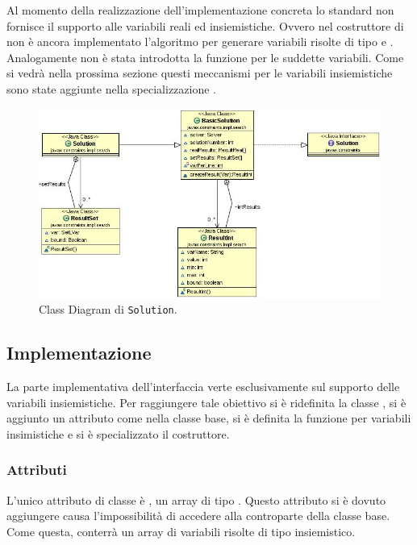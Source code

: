 Al momento della realizzazione dell'implementazione concreta 
lo standard non fornisce il supporto alle variabili reali ed 
insiemistiche. Ovvero nel costruttore di  non è ancora 
implementato l'algoritmo
per generare variabili risolte di tipo  e .
Analogamente non è stata introdotta la funzione  per
le suddette variabili. Come si vedrà nella prossima sezione questi meccanismi
per le variabili insiemistiche sono state aggiunte nella specializzazione
.

\begin{figure}[!ht]\label{solutionUML}
\centering
\includegraphics[scale=.5]{img/Solution.JPG}
\caption{Class Diagram di \texttt{Solution}.}
\end{figure}

\subsection{Implementazione}
La parte implementativa dell'interfaccia  verte esclusivamente
sul supporto delle variabili insiemistiche. Per raggiungere tale obiettivo si
è ridefinita la classe , si è aggiunto un attributo come nella
classe base, si è definita la funzione  per variabili
insimistiche e si è specializzato il costruttore.


\subsubsection{Attributi}
L'unico attributo di classe è , un array di tipo 
. Questo attributo si è dovuto aggiungere causa l'impossibilità
di accedere alla controparte della classe base. Come questa, conterrà
un array di variabili risolte di tipo insiemistico.

